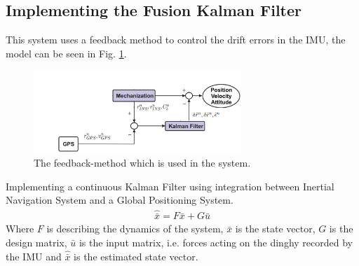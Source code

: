 \subsection{Implementing the Fusion Kalman Filter}
This system uses a feedback method to control the drift errors in the IMU, the model can be seen in Fig. \ref{Fig:Feedback}.
\begin{figure}[H]
\centering
\includegraphics[width=0.7\textwidth]{Figures/feed-back.png}
\caption{The feedback-method which is used in the system.}
\label{Fig:Feedback}
\end{figure}
Implementing a continuous Kalman Filter using integration between Inertial Navigation System and a Global Positioning System.
\begin{align}
\hat{\bar{x}} = F \bar{x} + G \bar{u}
\label{eq.state_1}
\end{align}
Where $F$ is describing the dynamics of the system, $\bar{x}$ is the state vector, $G$ is the design matrix, $\bar{u}$ is the input matrix, i.e. forces acting on the dinghy recorded by the IMU and $\hat{\bar{x}}$ is the estimated state vector. \\

